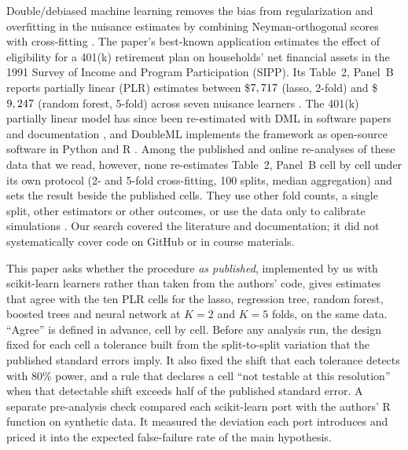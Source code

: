 \documentclass[11pt]{article}
\begin{document}
Double/debiased machine learning removes the bias from regularization and overfitting in
the nuisance estimates by combining Neyman-orthogonal scores with cross-fitting
\citep{chernozhukov2018dml}. The paper's best-known application estimates the effect of
eligibility for a 401(k) retirement plan on households' net financial assets in the 1991
Survey of Income and Program Participation (SIPP). Its Table~2, Panel~B reports partially
linear (PLR) estimates between \$$7,717$ (lasso, 2-fold) and
\$$9,247$ (random forest, 5-fold) across seven nuisance learners
\citep{chernozhukov2018dml}. The 401(k) partially linear model has since been
re-estimated with DML in software papers and documentation
\citep{ahrens2024ddml,doubleml401kdocs,chernozhukov2026lss}, and DoubleML implements the
framework as open-source software in Python and R \citep{bach2022doubleml,bach2024doublemlr}.
Among the published and online re-analyses of these data that we read, however, none
re-estimates Table~2, Panel~B cell by cell under its own protocol (2- and 5-fold
cross-fitting, 100 splits, median aggregation) and sets the result beside the published
cells. They use other fold counts, a single split, other estimators or other outcomes,
or use the data only to calibrate simulations
\citep{ahrens2024ddml,doubleml401kdocs,doubleml401krdocs,mendez2026,chernozhukov2026lss,chernozhukov2024causalml,belloni2017,wuthrich2023,ahrens2025modelavg,ahrens2025intro}.
Our search covered the literature and documentation; it did not systematically cover
code on GitHub or in course materials.

This paper asks whether the procedure \emph{as published}, implemented by us with
scikit-learn learners rather than taken from the authors' code, gives estimates that
agree with the ten PLR cells for the lasso, regression tree, random forest, boosted trees
and neural network at $K = 2$ and $K = 5$ folds, on the same data. ``Agree'' is defined
in advance, cell by cell. Before any analysis run, the design fixed for each cell a
tolerance built from the split-to-split variation that the published standard errors
imply. It also fixed the shift that each tolerance detects with 80\% power, and a rule
that declares a cell ``not testable at this resolution'' when that detectable shift
exceeds half of the published standard error. A separate pre-analysis check compared
each scikit-learn port with the authors' R function on synthetic data. It measured
the deviation each port introduces and priced it into the expected false-failure rate of
the main hypothesis.
\end{document}
